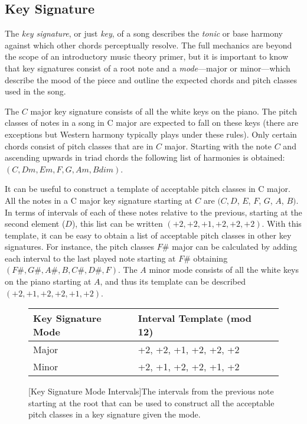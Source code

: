 \subsection{Key Signature}

The \textit{key signature}, or just \textit{key}, of a song describes the \textit{tonic} or base harmony against which other chords perceptually resolve. The full mechanics are beyond the scope of an introductory music theory primer, but it is important to know that key signatures consist of a root note and a \textit{mode}---major or minor---which describe the mood of the piece and outline the expected chords and pitch classes used in the song.

The $C$ major key signature consists of all the white keys on the piano. The pitch classes of notes in a song in C major are expected to fall on these keys (there are exceptions but Western harmony typically plays under these rules). Only certain chords consist of pitch classes that are in $C$ major. Starting with the note $C$ and ascending upwards in triad chords the following list of harmonies is obtained: $(C, Dm, Em, F, G, Am, Bdim)$.

It can be useful to construct a template of acceptable pitch classes in C major. All the notes in a C major key signature starting at $C$ are $(C, D$, $E$, $F$, $G$, $A$, $B)$. In terms of intervals of each of these notes relative to the previous, starting at the second element ($D$), this list can be written $(+2, +2, +1, +2, +2, +2)$. With this template, it can be easy to obtain a list of acceptable pitch classes in other key signatures. For instance, the pitch classes $F\#$ major can be calculated by adding each interval to the last played note starting at $F\#$ obtaining $(F\#,G\#,A\#,B,C\#,D\#,F)$. The $A$ minor mode consists of all the white keys on the piano starting at $A$, and thus its template can be described $(+2,+1,+2,+2,+1,+2)$.

\begin{figure}
\centering
\begin{tabular}{lll}
\toprule
Key Signature Mode        & Interval Template (mod 12) \\
\midrule
Major       & +2, +2, +1, +2, +2, +2 \\
Minor       & +2, +1, +2, +2, +1, +2 \\
\bottomrule
\end{tabular}
\caption{[Key Signature Mode Intervals]The intervals from the previous note starting at the root that can be used to construct all the acceptable pitch classes in a key signature given the mode.}
\label{ref:figkeysig}
\end{figure}
